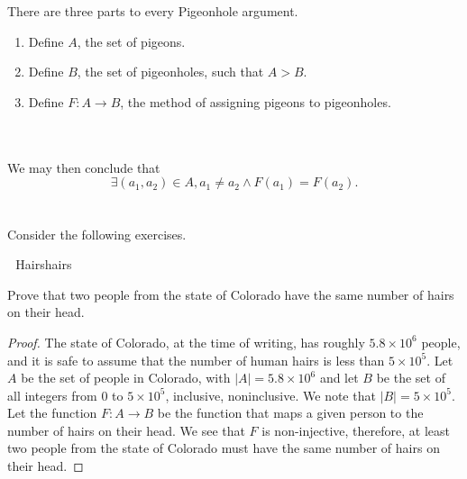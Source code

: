         \vphantom
        \\
        \\
        There are three parts to every Pigeonhole argument.
        \begin{enumerate}
            \item Define \(A\), the set of pigeons.
            \item Define \(B\), the set of pigeonholes, such that \(A>B\).
            \item Define \(F:A\to B\), the method of assigning pigeons to pigeonholes.
        \end{enumerate}
        \vphantom
        \\
        \\
        We may then conclude that
        \begin{equation*}
            \exists (a_1,a_2)\in A,a_1\neq a_2\wedge F(a_1)=F(a_2).
        \end{equation*}
        \vphantom
        \pagebreak
        \\
        \\
        Consider the following exercises.
        \begin{exercise}{\Difficulty\,\Difficulty\,\Difficulty\,\,Hairs}{hairs}
        
            Prove that two people from the state of Colorado have the same number of hairs on their head.
            \begin{proof}
                The state of Colorado, at the time of writing, has roughly \(5.8\times10^6\) people, and it is safe to assume that the number of human hairs is less than \(5\times10^5\). Let \(A\) be the set of people in Colorado, with \(|A|=5.8\times10^6\) and let \(B\) be the set of all integers from \(0\) to \(5\times10^5\), inclusive, noninclusive. We note that \(|B|=5\times10^5\). Let the function \(F:A\to B\) be the function that maps a given person to the number of hairs on their head. We see that \(F\) is non-injective, therefore, at least two people from the state of Colorado must have the same number of hairs on their head.
            \end{proof}
        
        \end{exercise}
